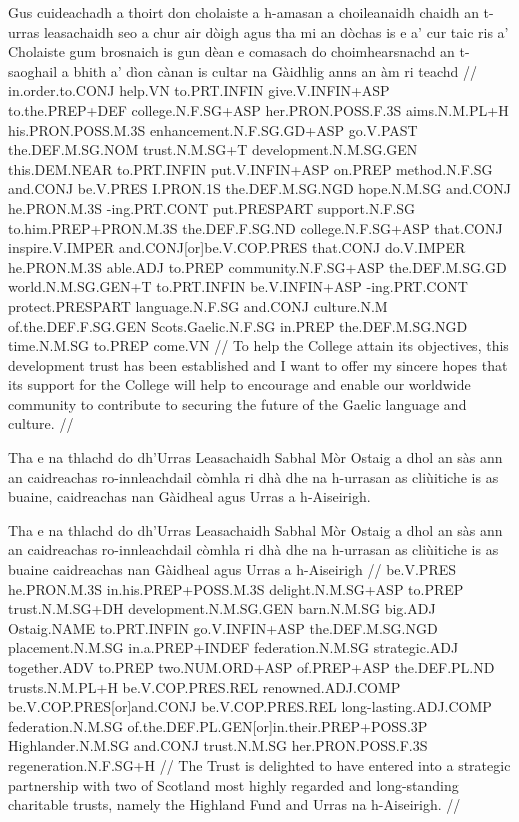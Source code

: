 \documentclass[a4paper,10pt]{article}
\begin{document}
\vspace{4mm}
\gla Gus cuideachadh a thoirt don cholaiste a h-amasan a choileanaidh chaidh an t-urras leasachaidh seo a chur air dòigh agus tha mi an dòchas is e a' cur taic ris a' Cholaiste gum brosnaich is gun dèan e comasach do choimhearsnachd an t-saoghail a bhith a' dìon cànan is cultar na Gàidhlig anns an àm ri teachd  //
\glb in.order.to.CONJ help.VN to.PRT.INFIN give.V.INFIN+ASP to.the.PREP+DEF college.N.F.SG+ASP her.PRON.POSS.F.3S aims.N.M.PL+H his.PRON.POSS.M.3S enhancement.N.F.SG.GD+ASP go.V.PAST the.DEF.M.SG.NOM trust.N.M.SG+T development.N.M.SG.GEN this.DEM.NEAR to.PRT.INFIN put.V.INFIN+ASP on.PREP method.N.F.SG and.CONJ be.V.PRES I.PRON.1S the.DEF.M.SG.NGD hope.N.M.SG and.CONJ he.PRON.M.3S -ing.PRT.CONT put.PRESPART support.N.F.SG to.him.PREP+PRON.M.3S the.DEF.F.SG.ND college.N.F.SG+ASP that.CONJ inspire.V.IMPER and.CONJ[or]be.V.COP.PRES that.CONJ do.V.IMPER he.PRON.M.3S able.ADJ to.PREP community.N.F.SG+ASP the.DEF.M.SG.GD world.N.M.SG.GEN+T to.PRT.INFIN be.V.INFIN+ASP -ing.PRT.CONT protect.PRESPART language.N.F.SG and.CONJ culture.N.M of.the.DEF.F.SG.GEN Scots.Gaelic.N.F.SG in.PREP the.DEF.M.SG.NGD time.N.M.SG to.PREP come.VN  //
\glft To help the College attain its objectives, this development trust has been established and I want to offer my sincere hopes that its support for the College will help to encourage and enable our worldwide community to contribute to securing the future of the Gaelic language and culture. //
\endgl
\xe

\ex
\begingl
\glpre Tha e na thlachd do dh'Urras Leasachaidh Sabhal Mòr Ostaig a dhol an sàs ann an caidreachas ro-innleachdail còmhla ri dhà dhe na h-urrasan as cliùitiche is as buaine, caidreachas nan Gàidheal agus Urras a h-Aiseirigh. 

\vspace{4mm}
\gla Tha e na thlachd do dh'Urras Leasachaidh Sabhal Mòr Ostaig a dhol an sàs {ann an} caidreachas ro-innleachdail còmhla ri dhà dhe na h-urrasan as cliùitiche is as buaine caidreachas nan Gàidheal agus Urras a h-Aiseirigh  //
\glb be.V.PRES he.PRON.M.3S in.his.PREP+POSS.M.3S delight.N.M.SG+ASP to.PREP trust.N.M.SG+DH development.N.M.SG.GEN barn.N.M.SG big.ADJ Ostaig.NAME to.PRT.INFIN go.V.INFIN+ASP the.DEF.M.SG.NGD placement.N.M.SG in.a.PREP+INDEF federation.N.M.SG strategic.ADJ together.ADV to.PREP two.NUM.ORD+ASP of.PREP+ASP the.DEF.PL.ND trusts.N.M.PL+H be.V.COP.PRES.REL renowned.ADJ.COMP be.V.COP.PRES[or]and.CONJ be.V.COP.PRES.REL long-lasting.ADJ.COMP federation.N.M.SG of.the.DEF.PL.GEN[or]in.their.PREP+POSS.3P Highlander.N.M.SG and.CONJ trust.N.M.SG her.PRON.POSS.F.3S regeneration.N.F.SG+H  //
\glft The Trust is delighted to have entered into a strategic partnership with two of Scotland most highly regarded and long-standing charitable trusts, namely the Highland Fund and Urras na h-Aiseirigh. //
\endgl
\xe
\end{document}
